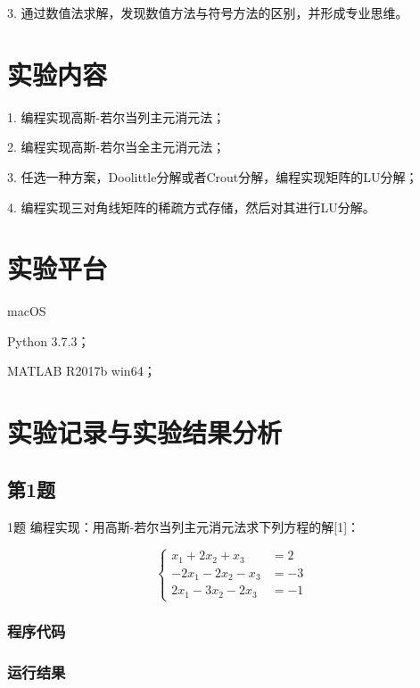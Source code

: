 \documentclass[UTF8, a4paper, zihao=-4, bibliography=totoc]{ctexart}
\begin{document}
3. 通过数值法求解，发现数值方法与符号方法的区别，并形成专业思维。

\section{实验内容}

1. 编程实现高斯-若尔当列主元消元法；

2. 编程实现高斯-若尔当全主元消元法；

3. 任选一种方案，Doolittle分解或者Crout分解，编程实现矩阵的LU分解；

4. 编程实现三对角线矩阵的稀疏方式存储，然后对其进行LU分解。

\section{实验平台}

macOS

Python 3.7.3；

MATLAB R2017b win64；

\section{实验记录与实验结果分析}

\subsection{第1题}

1题
编程实现：用高斯-若尔当列主元消元法求下列方程的解[1]：

\begin{equation}
    \left\{\begin{aligned}
        x_{1}+2 x_{2}+x_{3}     &=  2   \\
        -2 x_{1}-2 x_{2}-x_{3}  &=  -3  \\
        2 x_{1}-3 x_{2}-2 x_{3} &=  -1 
    \end{aligned}\right.
\end{equation}

\subsubsection{程序代码}



\subsubsection{运行结果}
\end{document}
